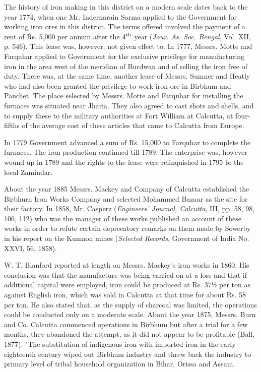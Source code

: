 The history of iron making in this district on a modern scale dates back to the year 1774, when one Mr. Indernarain Sarma applied to the Government for working iron ores in this district. The terms offered involved the payment of a rent of Rs. 5,000 per annum after the $4^{\rm th}$ year ({\it Jour. As. Soc. Bengal}, Vol. XII, p. 546). This lease was, however, not given effect to. In 1777, Messrs. Motte and Farquhar applied to Government for the exclusive privilege for manufacturing iron in the area west of the meridian of Burdwan and of selling the iron free of duty. There was, at the same time, another lease of Messrs. Sumner and Heatly who had also been granted the privilege to work iron ore in Birbhum and Panchet. The place selected by Messrs. Motte and Farquhar for installing the furnaces was situated near Jharia. They also agreed to cast shots and shells, and to supply these to the military authorities at Fort William at Calcutta, at four-fifths of the average cost of these articles that came to Calcutta from Europe.

In 1779 Government advanced a sum of Rs. 15,000 to Farquhar to complete the furnaces.  The iron production continued till 1789.  The enterprise was, however wound up in 1789 and the rights to the lease were relinquished in 1795 to the local Zamindar.

About the year 1885 Messrs. Mackey and Company of Calcutta established the Birbhurn Iron Works Company and selected Mohammed Bazaar as the site for their factory. In 1858, Mr. Casperz ({\it Engineers’ Journal, Calcutta}, III, pp. 58, 98, 106, 112) who was the manager of these works published an account of these works in order to refute certain deprecatory remarks on them made by Sowerby in his report on the Kumaon mines ({\it Selected Records}, Government of India No. XXVI, 56, 1858).

W. T. Blanford reported at length on Messrs. Mackey’s iron works in 1860. His conclusion was that the manufacture was being carried on at a loss and that if additional capital were employed, iron could be produced at Rs. $37½$ per ton as against English iron, which was sold in Calcutta at that time for about Rs. 58 per ton. He also stated that, as the supply of charcoal was limited, the operations could be conducted only on a moderate scale. About the year 1875, Messrs. Burn and Co. Calcutta commenced operations in Birbhum but after a trial for a few months, they abandoned the attempt, as it did not appear to be profitable (Ball, 1877). "The substitution of indigenous iron with imported iron in the early eighteenth century wiped out Birbhum industry and threw back the industry to primary level of tribal household organization in Bihar, Orissa and Assam.

